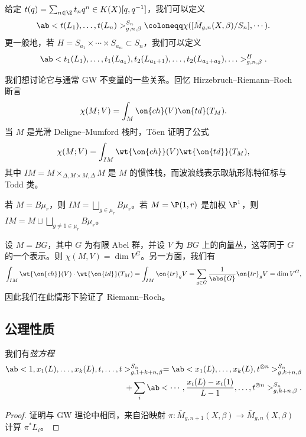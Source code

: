 给定 \(t(q) = \sum_{n \in \Z} t_n q^n \in K(X)[q,q^{-1}]\)，我们可以定义
\[ \ab< t(L_1), \ldots, t(L_n)>^{S_n}_{g,n,\beta} \coloneqq \chi ([\bar{M}_{g,n}(X,\beta)/S_n], \cdots). \]
更一般地，若 \(H = S_{a_1} \times \cdots \times S_{a_m} \subset S_n\)，我们可以定义
\[ \ab<t_1(L_1), \ldots, t_1(L_{a_1}), t_2(L_{a_1+1}), \ldots, t_2(L_{a_1+a_2}), \ldots>_{g,n,\beta}^H. \]

\begin{rmk}
    我们想讨论它与通常 GW 不变量的一些关系。回忆 Hirzebruch–Riemann–Roch 断言
    \[ \chi(M; V) = \int_M \on{ch}(V) \on{td}(T_M). \]
    当 \(M\) 是光滑 Deligne–Mumford 栈时，T\"oen 证明了公式
    \[ \chi(M; V) = \int_{IM} \wt{\on{ch}}(V) \wt{\on{td}}(T_M), \]
    其中 \(IM = M \times_{\Delta, M \times M, \Delta} M\) 是 \(M\) 的惯性栈，而波浪线表示取轨形陈特征标与 Todd 类。
\end{rmk}

\begin{exm}
    若 \(M = B\mu_r\)，则 \(IM = \bigsqcup_{g \in \mu_r} B \mu_r\)。若 \(M = \P(1, r)\) 是加权 \(\P^1\)，则 \(IM = M \sqcup \bigsqcup_{g \neq 1 \in \mu_r} B\mu_r\)。    
\end{exm}

\begin{exm}
    设 \(M = BG\)，其中 \(G\) 为有限 Abel 群，并设 \(V\) 为 \(BG\) 上的向量丛，这等同于 \(G\) 的一个表示。则 \(\chi(M, V) = \dim V^G\)。另一方面，我们有
    \[ \int_{IM} \wt{\on{ch}}(V) \cdot \wt{\on{td}}(T_M) = \int_{IM} \on{tr}_g V = \sum_{g \in G} \frac{1}{\abs{G}} \on{tr}_g V = \dim V^G, \]
    因此我们在此情形下验证了 Riemann–Roch。
\end{exm}

\subsection{公理性质}%
\label{sub:Axiomatic properties}

\begin{lem}
    我们有\textit{弦方程}
    \begin{align*}
        \ab< 1, x_1(L), \ldots, x_k(L), t, \ldots, t >_{g, 1+k+n, \beta}^{S_n} = \ab<x_1(L), \ldots, x_k(L), t^{\otimes n}>^{S_n}_{g,k+n,\beta} \\
        + \sum_i \ab< \cdots, \frac{x_i(L) - x_i(1)}{L-1}, \ldots, t^{\otimes n}>^{S_n}_{g,k+n,\beta}. 
    \end{align*}
\end{lem}

\begin{proof}
    证明与 GW 理论中相同，来自沿映射 \(\pi \colon\bar{M}_{g,n+1}(X,\beta) \to \bar{M}_{g,n}(X,\beta)\) 计算 \(\pi^* L_i\)。
\end{proof}

